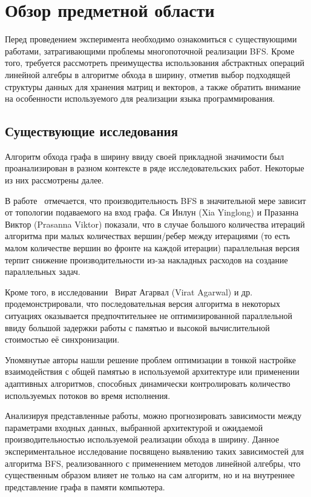 
\section{Обзор предметной области}
\label{sec:relatedworks}
\noindent Перед проведением эксперимента необходимо ознакомиться с существующими работами, затрагивающими проблемы многопоточной реализации BFS. Кроме того, требуется рассмотреть преимущества использования абстрактных операций линейной алгебры в алгоритме обхода в ширину, отметив выбор подходящей структуры данных для хранения матриц и векторов, а также обратить внимание на особенности используемого для реализации языка программирования.



\subsection{Существующие исследования}
Алгоритм обхода графа в ширину ввиду своей прикладной значимости был проанализирован в разном контексте в ряде исследовательских работ. Некоторые из них рассмотрены далее.

В работе~\cite{adaptiveBFS} отмечается, что производительность BFS в значительной мере зависит от топологии подаваемого на вход графа. Ся Инлун (Xia Yinglong) и Празанна Виктор (Prasanna Viktor) показали, что в случае большого количества итераций алгоритма при малых количествах вершин/ребер между итерациями (то есть малом количестве вершин во фронте на каждой итерации) параллельная версия терпит снижение производительности из-за накладных расходов на создание параллельных задач.

Кроме того, в исследовании~\cite{scalableBFS} Вират Агарвал (Virat Agarwal) и др. продемонстрировали, что последовательная версия алгоритма в некоторых ситуациях оказывается предпочтительнее не оптимизированной параллельной ввиду большой задержки работы с памятью и высокой вычислительной стоимостью её синхронизации. 

Упомянутые авторы нашли решение проблем оптимизации в тонкой настройке взаимодействия с общей памятью в используемой архитектуре или применении адаптивных алгоритмов, способных динамически контролировать количество используемых потоков во время исполнения.

Анализируя представленные работы, можно прогнозировать зависимости между параметрами входных данных, выбранной архитектурой и ожидаемой производительностью используемой реализации обхода в ширину. Данное экспериментальное исследование посвящено выявлению таких зависимостей для алгоритма BFS, реализованного с применением методов линейной алгебры, что существенным образом влияет не только на сам алгоритм, но и на внутреннее представление графа в памяти компьютера.



